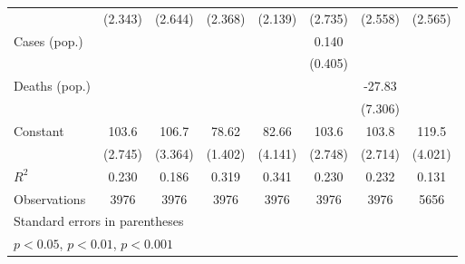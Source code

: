 \documentclass{article}
\begin{document}
{\begin{longtable}{l*{7}{c}}
                &  (2.343)         &  (2.644)         &  (2.368)         &  (2.139)         &  (2.735)         &  (2.558)         &  (2.565)         \\
Cases (pop.)    &                  &                  &                  &                  &    0.140         &                  &                  \\
                &                  &                  &                  &                  &  (0.405)         &                  &                  \\
Deaths (pop.)   &                  &                  &                  &                  &                  &   -27.83\sym{***}&                  \\
                &                  &                  &                  &                  &                  &  (7.306)         &                  \\
Constant        &    103.6\sym{***}&    106.7\sym{***}&    78.62\sym{***}&    82.66\sym{***}&    103.6\sym{***}&    103.8\sym{***}&    119.5\sym{***}\\
                &  (2.745)         &  (3.364)         &  (1.402)         &  (4.141)         &  (2.748)         &  (2.714)         &  (4.021)         \\
\hline
\(R^{2}\)       &    0.230         &    0.186         &    0.319         &    0.341         &    0.230         &    0.232         &    0.131         \\
Observations    &     3976         &     3976         &     3976         &     3976         &     3976         &     3976         &     5656         \\
\hline\hline
\multicolumn{8}{l}{\footnotesize Standard errors in parentheses}\\
\multicolumn{8}{l}{\footnotesize \sym{*} \(p<0.05\), \sym{**} \(p<0.01\), \sym{***} \(p<0.001\)}\\
\end{longtable}
}
\end{document}
